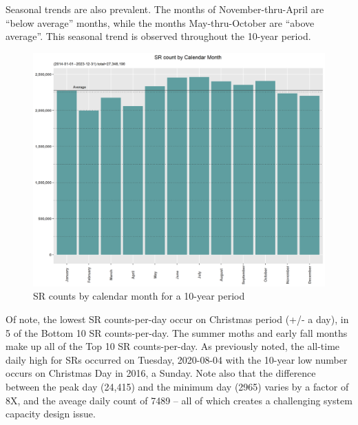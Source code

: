 \documentclass[12pt, titlepage]{article}
\begin{document}
Seasonal trends are also prevalent. The months of November-thru-April are ``below average'' months, while the months May-thru-October are ``above average''.
 This seasonal trend is observed throughout the 10-year period.

\begin{figure}[htbp]
  \centering
  \includegraphics[scale=0.65]{Calendar-Month.png}
  \caption{SR counts by calendar month for a 10-year period}
  \label{fig:calendar-months-counts}
\end{figure}

Of note, the lowest SR counts-per-day occur on Christmas  period (+/- a day), in 5 of the Bottom 10 SR counts-per-day. The summer moths and early
fall months make up all of the Top 10 SR counts-per-day. As previously noted, the all-time daily high for SRs occurred on Tuesday, 2020-08-04 with the 10-year
low number occurs on Christmas Day in 2016, a Sunday. Note also that the difference between the peak day (24,415) and the minimum day (2965) varies
by a factor of 8X, and the aveage daily count of 7489 -- all of which creates a challenging  system capacity design issue.
\end{document}
